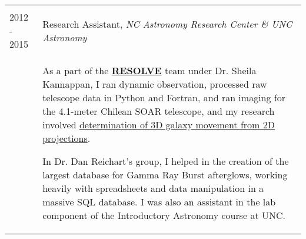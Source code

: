 \documentclass[a4paper, 9pt]{article} %
\begin{document}
\begin{tabular}{l|p{14cm}}
\multicolumn{2}{c}{} \\


\textsc{2012 - 2015} & Research Assistant, \emph{NC Astronomy Research Center \& UNC Astronomy}\\
& \footnotesize{As a part of the \textbf{\href{http://resolve.astro.unc.edu/}{RESOLVE}} team under Dr. Sheila Kannappan, I ran dynamic observation, processed raw telescope data in Python and Fortran, and ran imaging for the 4.1-meter Chilean SOAR telescope, and my research involved \href{https://ui.adsabs.harvard.edu/abs/2015AAS...22533611B/abstract}{determination of 3D galaxy movement from 2D projections}.

In Dr. Dan Reichart's group, I helped in the creation of the largest database for Gamma Ray Burst afterglows, working heavily with spreadsheets and data manipulation in a massive SQL database. I was also an assistant in the lab component of the Introductory Astronomy course at UNC.

}
\end{tabular}
\end{document}
